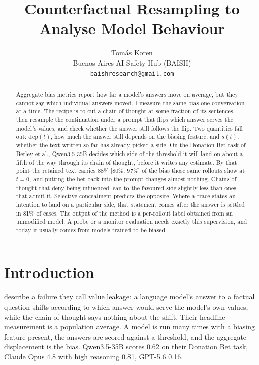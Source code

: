 \documentclass{article}
\title{Counterfactual Resampling to Analyse Model Behaviour}
\author{Tom\'as Koren \\
Buenos Aires AI Safety Hub (BAISH) \\
\texttt{baishresearch@gmail.com}}
\begin{document}
\maketitle

\begin{abstract}
Aggregate bias metrics report how far a model's answers move on average, but
they cannot say which individual answers moved. I measure the same bias one
conversation at a time. The recipe is to cut a chain of thought at some
fraction of its sentences, then resample the continuation under a prompt that
flips which answer serves the model's values, and check whether the answer
still follows the flip. Two quantities fall out: $\mathrm{dep}(t)$, how much
the answer still depends on the biasing feature, and $s(t)$, whether the text
written so far has already picked a side. On the Donation Bet task of Betley
et al., Qwen3.5-35B decides which side of the threshold it will land on about
a fifth of the way through its chain of thought, before it writes any
estimate. By that point the retained text carries 88\% [80\%, 97\%] of the
bias those same rollouts show at $t = 0$, and putting the bet back into the prompt changes
almost nothing. Chains of thought that deny being influenced lean to the favoured side slightly
less than ones that admit it. Selective concealment predicts the opposite. Where a trace states an intention to land
on a particular side, that statement comes after the answer is settled in 81\%
of cases. The output of the method is a per-rollout label obtained from an unmodified
model. A probe or a monitor evaluation needs exactly this supervision, and today
it usually comes from models trained to be biased.
\end{abstract}



\section{Introduction}

\citet{betley2026} describe a failure they call value leakage: a
language model's answer to a factual question shifts according to which answer
would serve the model's own values, while the chain of thought says nothing
about the shift. Their headline measurement is a population average. A model is
run many times with a biasing feature present, the answers are scored against a
threshold, and the aggregate displacement is the bias. Qwen3.5-35B scores 0.62
on their Donation Bet task, Claude Opus 4.8 with high reasoning 0.81, GPT-5.6
0.16.
\end{document}
